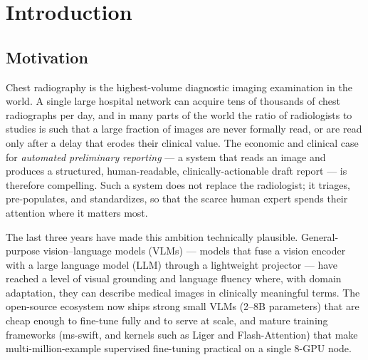 \documentclass[11pt,a4paper]{article}
\begin{document}
\begin{abstract}
predicted-token distribution, per-tag and per-parent-class sensitivity/specificity/precision, and a focused nodule false-negative error analysis. On the 25k subset the model reaches a per-tag macro sensitivity of 0.874 and a 25-parent-class macro of 0.863 sensitivity / 0.863 specificity, with devices and major pathologies performing strongest. We close with a candid discussion of failure modes and outline the path from SFT to preference optimization and reinforcement learning. This report is written as a reproducible engineering record: every dataset, hyperparameter, and analysis script referenced here is enumerated in the appendices.
\end{abstract}

\tableofcontents
\newpage

\section{Introduction}

\subsection{Motivation}
Chest radiography is the highest-volume diagnostic imaging examination in the world. A single large hospital network can acquire tens of thousands of chest radiographs per day, and in many parts of the world the ratio of radiologists to studies is such that a large fraction of images are never formally read, or are read only after a delay that erodes their clinical value. The economic and clinical case for \emph{automated preliminary reporting} --- a system that reads an image and produces a structured, human-readable, clinically-actionable draft report --- is therefore compelling. Such a system does not replace the radiologist; it triages, pre-populates, and standardizes, so that the scarce human expert spends their attention where it matters most.

The last three years have made this ambition technically plausible. General-purpose vision--language models (VLMs) --- models that fuse a vision encoder with a large language model (LLM) through a lightweight projector --- have reached a level of visual grounding and language fluency where, with domain adaptation, they can describe medical images in clinically meaningful terms. The open-source ecosystem now ships strong small VLMs (2--8B parameters) that are cheap enough to fine-tune fully and to serve at scale, and mature training frameworks (ms-swift, and kernels such as Liger and Flash-Attention) that make multi-million-example supervised fine-tuning practical on a single 8-GPU node.
\end{document}
